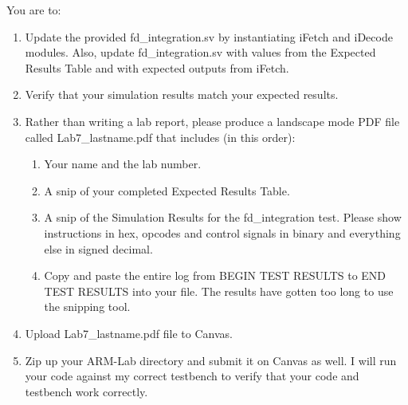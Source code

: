 You are to:
\begin{enumerate}
\item Update the provided fd\_integration.sv by instantiating iFetch and iDecode modules.  Also, update fd\_integration.sv with values from the Expected Results Table and with expected outputs from iFetch. 
\item Verify that your simulation results match your expected results.
\item Rather than writing a lab report, please produce a landscape mode PDF file called Lab7\_lastname.pdf that includes (in this order):
\begin{enumerate}
	\item Your name and the lab number.
	\item A snip of your completed Expected Results Table.
	\item A snip of the Simulation Results for the fd\_integration test.  Please show instructions in hex, opcodes and control signals in binary and everything else in signed decimal.  
	\item Copy and paste the entire log from BEGIN TEST RESULTS to END TEST RESULTS into your file.  The results have gotten too long to use the snipping tool.	
\end{enumerate}
\item Upload Lab7\_lastname.pdf file to Canvas.
\item Zip up your ARM-Lab directory and submit it on Canvas as well.  I will run your code against my correct testbench to verify that your code and testbench work correctly.
\end{enumerate} 